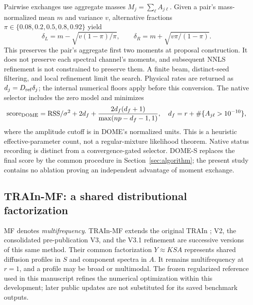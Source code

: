Pairwise exchanges use aggregate masses $M_j=\sum_\ell A_{j\ell}$. Given a pair's mass-normalized mean $m$ and variance $v$, alternative fractions $\pi\in\{0.08,0.2,0.5,0.8,0.92\}$ yield
\begin{equation}\label{eq:domeexchange}
 \delta_L=m-\sqrt{v(1-\pi)/\pi},\qquad \delta_R=m+\sqrt{v\pi/(1-\pi)}.
\end{equation}
This preserves the pair's aggregate first two moments at proposal construction. It does not preserve each spectral channel's moments, and subsequent NNLS refinement is not constrained to preserve them. A finite beam, distinct-seed filtering, and local refinement limit the search. Physical rates are returned as $d_j=D_{\rm ref}\delta_j$; the internal numerical floors apply before this conversion. The native selector includes the zero model and minimizes
\begin{equation}\label{eq:domescore}
 \mathrm{score}_{\rm DOME}=\mathrm{RSS}/\sigma^2+2d_f+
 \frac{2d_f(d_f+1)}{\max(np-d_f-1,1)},
 \quad d_f=r+\#\{A_{j\ell}>10^{-10}\},
\end{equation}
where the amplitude cutoff is in DOME's normalized units. This is a heuristic effective-parameter count, not a regular-mixture likelihood theorem. Native status recording is distinct from a convergence-gated selector. DOME-S replaces the final score by the common procedure in Section~\ref{sec:algorithm}; the present study contains no ablation proving an independent advantage of moment exchange.

\subsection{TRAIn-MF: a shared distributional factorization}\label{sec:mfmath}
MF denotes \emph{multifrequency}. TRAIn-MF extends the original TRAIn \cite{train}; V2, the consolidated pre-publication V3, and the V3.1 refinement \cite{mfv31} are successive versions of this same method. Their common factorization $Y\approx KSA$ represents shared diffusion profiles in $S$ and component spectra in $A$. It remains multifrequency at $r=1$, and a profile may be broad or multimodal. The frozen regularized reference used in this manuscript refines the numerical optimization within this development; later public updates are not substituted for its saved benchmark outputs.

